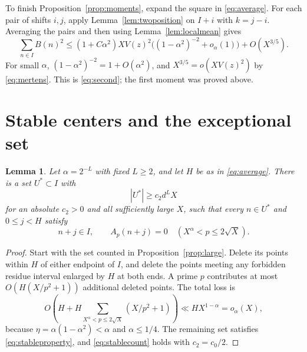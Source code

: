 \documentclass[11pt,reqno]{amsart}
\newtheorem{lemma}[theorem]{Lemma}
\theoremstyle{remark}
\numberwithin{equation}{section}
\begin{document}
To finish Proposition~\ref{prop:moments}, expand the square in
\eqref{eq:average}. For each pair of shifts $i,j$, apply
Lemma~\ref{lem:twoposition} on $I+i$ with $k=j-i$.
Averaging the pairs and then using Lemma~\ref{lem:localmean} gives
\[
 \sum_{n\in I}B(n)^2
 \leq(1+C\alpha^2)XV(z)^2
       \bigl((1-\alpha^2)^{-2}+o_\alpha(1)\bigr)+O(X^{3/5}).
\]
For small $\alpha$, $(1-\alpha^2)^{-2}=1+O(\alpha^2)$, and
$X^{3/5}=o(XV(z)^2)$ by \eqref{eq:mertens}.
This is \eqref{eq:second}; the first moment was proved above.

\section{Stable centers and the exceptional set}\label{sec:finish}

\begin{lemma}\label{lem:stable}
Let $\alpha=2^{-L}$ with fixed $L\geq2$, and let $H$ be as in
\eqref{eq:average}. There is a set $U^*\subset I$ with
\begin{equation}\label{eq:stablecount}
 |U^*|\geq c_2d^L X
\end{equation}
for an absolute $c_2>0$ and all sufficiently large $X$, such that
every $n\in U^*$ and $0\leq j<H$ satisfy
\begin{equation}\label{eq:stableproperty}
 n+j\in I,\qquad A_p(n+j)=0
 \quad(X^\alpha<p\leq2\sqrt X).
\end{equation}
\end{lemma}

\begin{proof}
Start with the set counted in Proposition~\ref{prop:large}.
Delete its points within $H$ of either endpoint of $I$, and delete
the points meeting any forbidden residue interval enlarged by $H$
at both ends. A prime $p$ contributes at most
$O(H(X/p^2+1))$ additional deleted points. The total loss is
\[
 O\left(H+H\sum_{X^\alpha<p\leq2\sqrt X}(X/p^2+1)\right)
 \ll HX^{1-\alpha}=o_\alpha(X),
\]
because $\eta=\alpha(1-\alpha^2)<\alpha$ and $\alpha\leq1/4$.
The remaining set satisfies \eqref{eq:stableproperty}, and
\eqref{eq:stablecount} holds with $c_2=c_0/2$.
\end{proof}
\end{document}
